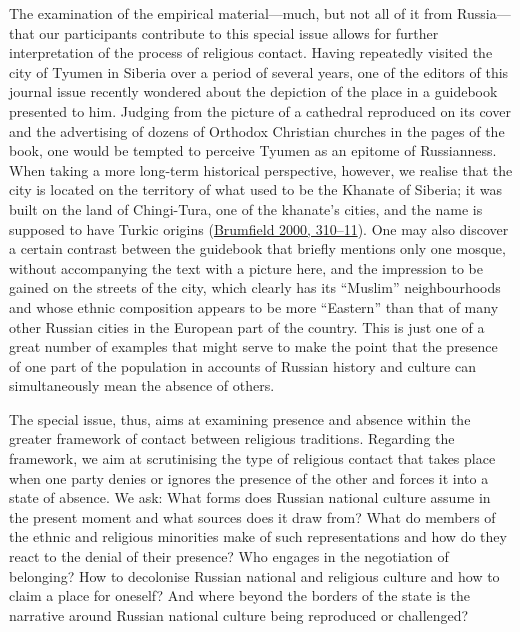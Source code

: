 \documentclass[
  english,
  a4paper,
  DIV=12,
  footlines=2.1,
  usegeometry=true]{scrartcl}
\begin{document}
\leavevmode\marginpar{\textcolor{parnum}{{[}10{]}}}The examination of
the empirical material---much, but not all of it from Russia---that our
participants contribute to this special issue allows for further
interpretation of the process of religious contact. Having repeatedly
visited the city of Tyumen in Siberia over a period of several years,
one of the editors of this journal issue recently wondered about the
depiction of the place in a guidebook presented to him. Judging from the
picture of a cathedral reproduced on its cover and the advertising of
dozens of Orthodox Christian churches in the pages of the book, one
would be tempted to perceive Tyumen as an epitome of Russianness. When
taking a more long-term historical perspective, however, we realise that
the city is located on the territory of what used to be the Khanate of
Siberia; it was built on the land of Chingi-Tura, one of the khanate's
cities, and the name is supposed to have Turkic origins
(\protect\hyperlink{ref-brumfield_photographic_2000}{Brumfield 2000,
310--11}). One may also discover a certain contrast between the
guidebook that briefly mentions only one mosque, without accompanying
the text with a picture here, and the impression to be gained on the
streets of the city, which clearly has its ``Muslim'' neighbourhoods and
whose ethnic composition appears to be more ``Eastern'' than that of
many other Russian cities in the European part of the country. This is
just one of a great number of examples that might serve to make the
point that the presence of one part of the population in accounts of
Russian history and culture can simultaneously mean the absence of
others.

\leavevmode\marginpar{\textcolor{parnum}{{[}11{]}}}The special issue,
thus, aims at examining presence and absence within the greater
framework of contact between religious traditions. Regarding the
framework, we aim at scrutinising the type of religious contact that
takes place when one party denies or ignores the presence of the other
and forces it into a state of absence. We ask: What forms does Russian
national culture assume in the present moment and what sources does it
draw from? What do members of the ethnic and religious minorities make
of such representations and how do they react to the denial of their
presence? Who engages in the negotiation of belonging? How to decolonise
Russian national and religious culture and how to claim a place for
oneself? And where beyond the borders of the state is the narrative
around Russian national culture being reproduced or challenged?
\end{document}
